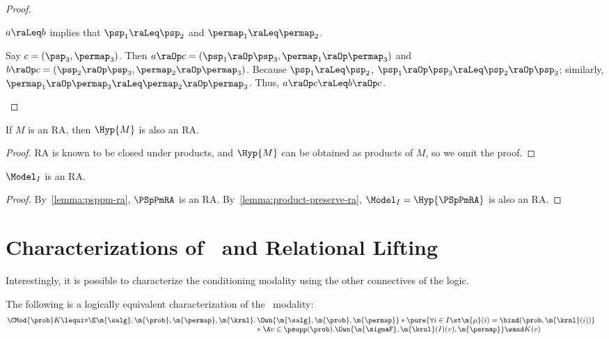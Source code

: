 \documentclass[acmsmall,nonacm,screen,appendix]{acmart}
\begin{document}
\begin{proof}
\begin{induction}
      $a \raLeq b $ implies that
      $\psp_1 \raLeq \psp_2$ and $\permap_1 \raLeq \permap_2$.

      Say $c = (\psp_3, \permap_3)$.
      Then $a \raOp c = (\psp_1 \raOp \psp_3, \permap_1 \raOp \permap_3)$ and $b \raOp c = (\psp_2 \raOp \psp_3, \permap_2 \raOp \permap_3)$.
      Because $\psp_1 \raLeq \psp_2$,
      $\psp_1 \raOp \psp_3 \raLeq \psp_2 \raOp \psp_3$;
      similarly,
      $\permap_1 \raOp \permap_3 \raLeq \permap_2 \raOp \permap_3$.
      Thus, $a \raOp c \raLeq b \raOp c$.
      \qedhere
  \end{induction}
\end{proof}

  \begin{lemma}
    \label{lemma:product-preserve-ra}
    If $M$ is an RA, then $\Hyp{M}$ is also an RA.
  \end{lemma}

  \begin{proof}
    RA is known to be closed under products, and
    $\Hyp{M}$ can be obtained as products of $M$,
    so we omit the proof.
  \end{proof}

  \begin{lemma}
  $\Model_I$ is an RA.
\end{lemma}

\begin{proof}
  By~\cref{lemma:psppm-ra}, $\PSpPmRA$ is an RA.
  By~\cref{lemma:product-preserve-ra},
  $\Model_I = \Hyp{\PSpPmRA}$ is also an RA.
\end{proof}


 \section{Characterizations of \SuperCond\ and Relational Lifting}
\label{sec:appendix:alt-cond-rl}

Interestingly, it is possible to characterize the conditioning modality
using the other connectives of the logic.
\begin{proposition}
\label{prop:cond-as-wand}
  The following is a logically equivalent characterization
  of the \supercond\ modality:
  \begin{align*}
    \CMod{\prob} K &\lequiv
    \begin{array}[t]{@{}r@{\,}l@{}}
      \E \m{\salg}, \m{\prob}, \m{\permap}, \m{\krnl}.
        & \Own{\m{\salg}, \m{\prob}, \m{\permap}} *
        \pure{\forall i\in I\st
        \m{\mu}(i) = \bind(\prob, \m{\krnl}(i))}
     \\ & * \;
     \A v \in \psupp(\prob).
     \Own{\m{\sigmaF}, \m{\krnl}(I)(v), \m{\permap}}
     \wand
     K(v)
    \end{array}
\end{align*}
\end{proposition}
\end{document}
